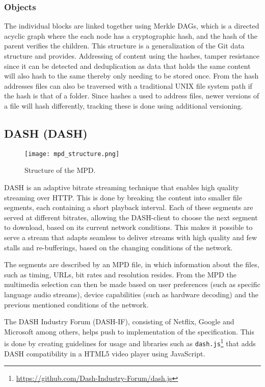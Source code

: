 \subsubsection{Objects}
The individual blocks are linked together using Merkle \acs{DAG}s, which is a directed acyclic graph where the each node has a cryptographic hash, and the hash of the parent verifies the children. This structure is a generalization of the Git data structure and provides. Addressing of content using the hashes, tamper resistance since it can be detected and deduplication as data that holds the same content will also hash to the same thereby only needing to be stored once. From the hash addresses files can also be traversed with a traditional UNIX file system path if the hash is that of a folder.
Since hashes a used to address files, newer versions of a file will hash differently, tracking these is done using additional versioning.


\subsection{\acl{DASH} (\acs{DASH})}

\begin{figure}[bth]
    \texttt{[image: mpd\_structure.png]}
    \caption{Structure of the \acs{MPD}.}
    \label{fig:mpd_structure}
\end{figure}

\ac{DASH} is an adaptive bitrate streaming technique that enables high quality streaming over \acs{HTTP}. This is done by breaking the content into smaller file segments, each containing a short playback interval. Each of these segments are served at different bitrates, allowing the \acs{DASH}-client to choose the next segment to download, based on its current network conditions.
This makes it possible to serve a stream that adapts seamless to deliver streams with high quality and few stalls and re-bufferings, based on the changing conditions of the network.

The segments are described by an \ac{MPD} file, in which information about the files, such as timing, \acs{URL}s, bit rates and resolution resides. From the \acs{MPD} the multimedia selection can then be made based on user preferences (such as specific language audio streams), device capabilities (such as hardware decoding) and the previous mentioned conditions of the network.

The \acs{DASH} Industry Forum (DASH-IF), consisting of Netflix, Google and Microsoft among others, helps push to implementation of the specification\cite{ISO23009}. This is done by creating guidelines for usage and libraries such as \texttt{dash.js}\footnote{\url{https://github.com/Dash-Industry-Forum/dash.js}} that adds \acs{DASH} compatibility in a HTML5 video player using JavaScript.

